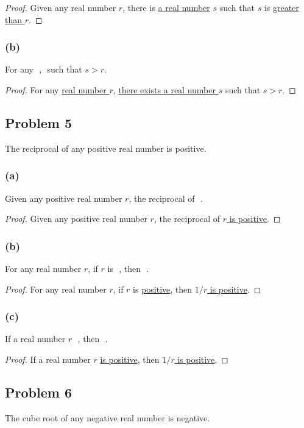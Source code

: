 \documentclass[14pt]{extarticle}
\newcommand{\fbl}{\underline{\hspace{1cm}}\,\,}
\begin{document}
\begin{proof}
Given any real number $r$, there is \underline{a real number} $s$ such that $s$
 is \underline{greater than $r$}.
\end{proof}

\subsubsection{(b)}
For any \fbl, \fbl such that $s > r$.

\begin{proof}
For any \underline{real number $r$}, \underline{there exists a real number $s$}
such that $s > r$.
\end{proof}

\subsection{Problem 5}
The reciprocal of any positive real number is positive.

\subsubsection{(a)}
Given any positive real number $r$, the reciprocal of \fbl.

\begin{proof}
    Given any positive real number $r$, the reciprocal of \underline{$r$ is positive}.
\end{proof}

\subsubsection{(b)}
For any real number $r$, if $r$ is \fbl, then \fbl.

\begin{proof}
For any real number $r$, if $r$ is \underline{positive}, then \underline{$1/r$
is positive}.
\end{proof}

\subsubsection{(c)}
If a real number $r$ \fbl, then \fbl.

\begin{proof}
If a real number $r$ \underline{is positive}, then \underline{$1/r$ is
positive}.
\end{proof}

\subsection{Problem 6}
The cube root of any negative real number is negative.
\end{document}
